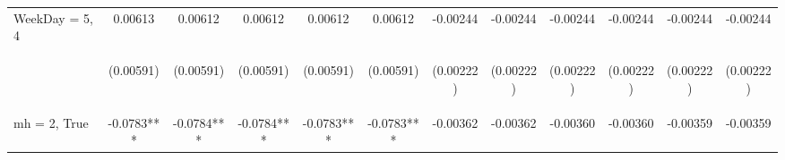 \documentclass[]{article}
\begin{document}
\begin{center}
\begin{tabular}{lccccccccccc}
WeekDay = 5, 4 & 0.00613 & 0.00612 & 0.00612 & 0.00612 & 0.00612 & -0.00244 & -0.00244 & -0.00244 & -0.00244 & -0.00244 & -0.00244 \\
\vspace{4pt} & \begin{footnotesize}(0.00591)\end{footnotesize} & \begin{footnotesize}(0.00591)\end{footnotesize} & \begin{footnotesize}(0.00591)\end{footnotesize} & \begin{footnotesize}(0.00591)\end{footnotesize} & \begin{footnotesize}(0.00591)\end{footnotesize} & \begin{footnotesize}(0.00222)\end{footnotesize} & \begin{footnotesize}(0.00222)\end{footnotesize} & \begin{footnotesize}(0.00222)\end{footnotesize} & \begin{footnotesize}(0.00222)\end{footnotesize} & \begin{footnotesize}(0.00222)\end{footnotesize} & \begin{footnotesize}(0.00222)\end{footnotesize} \\
mh = 2, True & -0.0783*** & -0.0784*** & -0.0784*** & -0.0783*** & -0.0783*** & -0.00362 & -0.00362 & -0.00360 & -0.00360 & -0.00359 & -0.00359 \\

\end{tabular}
\end{center}
\end{document}
